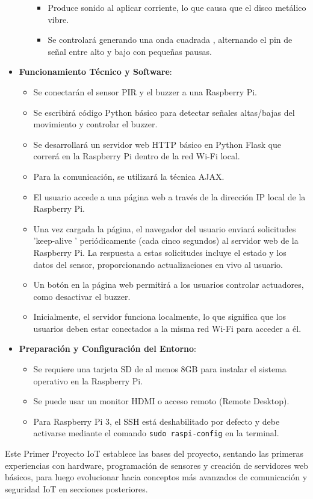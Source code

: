 \documentclass{report}
\begin{document}
\begin{itemize}
\begin{itemize}
\begin{itemize}
                \item Produce sonido al aplicar corriente, lo que causa que el disco metálico vibre.
                \item Se controlará generando una  onda cuadrada , alternando el pin de señal entre alto y bajo con pequeñas pausas.
            \end{itemize}
    \end{itemize}
    \item \textbf{Funcionamiento Técnico y Software}:
    \begin{itemize}
        \item Se conectarán el sensor PIR y el buzzer a una Raspberry Pi.
        \item Se escribirá código Python básico para detectar señales altas/bajas del movimiento y controlar el buzzer.
        \item Se desarrollará un servidor web HTTP básico en Python Flask que correrá en la Raspberry Pi dentro de la red Wi-Fi local.
        \item Para la comunicación, se utilizará la técnica AJAX.
        \item El usuario accede a una página web a través de la dirección IP local de la Raspberry Pi.
        \item Una vez cargada la página, el navegador del usuario enviará solicitudes  'keep-alive ' periódicamente (cada cinco segundos) al servidor web de la 
        Raspberry Pi. La respuesta a estas solicitudes incluye el estado y los datos del sensor, proporcionando actualizaciones en vivo al usuario.
        \item Un botón en la página web permitirá a los usuarios controlar actuadores, como desactivar el buzzer.
        \item Inicialmente, el servidor funciona localmente, lo que significa que los usuarios deben estar conectados a la misma red Wi-Fi para acceder a él.
    \end{itemize}
    \item \textbf{Preparación y Configuración del Entorno}:
    \begin{itemize}
        \item Se requiere una tarjeta SD de al menos 8GB para instalar el sistema operativo en la Raspberry Pi.
        \item Se puede usar un monitor HDMI o acceso remoto (Remote Desktop).
        \item Para Raspberry Pi 3, el SSH está deshabilitado por defecto y debe activarse mediante el comando \verb|sudo raspi-config| en la terminal.
    \end{itemize}
\end{itemize}
Este Primer Proyecto IoT establece las bases del proyecto, sentando las primeras experiencias con hardware, programación de sensores y creación de servidores 
web básicos, para luego evolucionar hacia conceptos más avanzados de comunicación y seguridad IoT en secciones posteriores.
\end{document}
